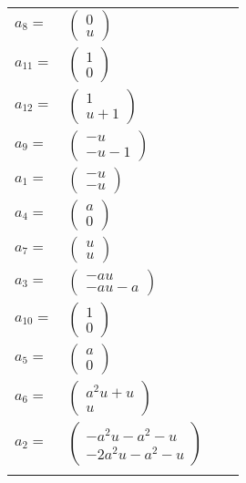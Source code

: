 \documentclass[1p]{elsarticle_modified}
\theoremstyle{definition}
\begin{document}
\begin{tabular}{m{7pt} m{180pt} m{7pt} m{180pt} }
\flushright $a_{8}=$&$\begin{pmatrix}0\\u\end{pmatrix}$ \\
\flushright $a_{11}=$&$\begin{pmatrix}1\\0\end{pmatrix}$ \\
\flushright $a_{12}=$&$\begin{pmatrix}1\\u+1\end{pmatrix}$ \\
\flushright $a_{9}=$&$\begin{pmatrix}- u\\- u-1\end{pmatrix}$ \\
\flushright $a_{1}=$&$\begin{pmatrix}- u\\- u\end{pmatrix}$ \\
\flushright $a_{4}=$&$\begin{pmatrix}a\\0\end{pmatrix}$ \\
\flushright $a_{7}=$&$\begin{pmatrix}u\\u\end{pmatrix}$ \\
\flushright $a_{3}=$&$\begin{pmatrix}- a u\\- a u- a\end{pmatrix}$ \\
\flushright $a_{10}=$&$\begin{pmatrix}1\\0\end{pmatrix}$ \\
\flushright $a_{5}=$&$\begin{pmatrix}a\\0\end{pmatrix}$ \\
\flushright $a_{6}=$&$\begin{pmatrix}a^2 u+u\\u\end{pmatrix}$ \\
\flushright $a_{2}=$&$\begin{pmatrix}- a^2 u- a^2- u\\-2 a^2 u- a^2- u\end{pmatrix}$\\&\end{tabular}
\end{document}
